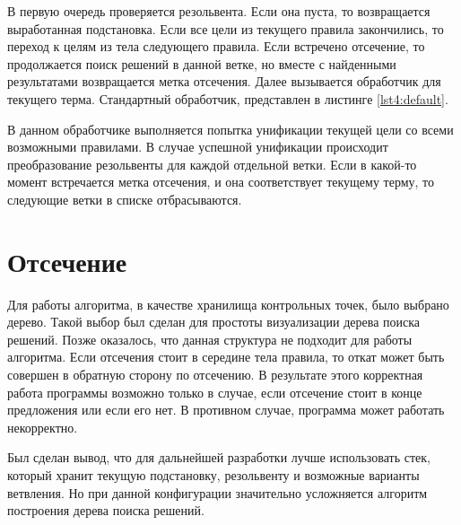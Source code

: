 В первую очередь проверяется резольвента. Если она пуста, то возвращается выработанная подстановка. Если все цели из текущего правила закончились, то переход к целям из тела следующего правила.
Если встречено отсечение, то продолжается поиск решений в данной ветке, но вместе с найденными результатами возвращается метка отсечения.
Далее вызывается обработчик для текущего терма. Стандартный обработчик, представлен в листинге \ref{lst4:default}.


В данном обработчике выполняется попытка унификации текущей цели со всеми возможными правилами. В случае успешной унификации происходит преобразование резольвенты для каждой отдельной ветки. Если в какой-то момент встречается метка отсечения, и она соответствует текущему терму, то следующие ветки в списке отбрасываются.

\section{Отсечение}
Для работы алгоритма, в качестве хранилища контрольных точек, было выбрано дерево. Такой выбор был сделан для простоты визуализации дерева поиска решений. Позже оказалось, что данная структура не подходит для работы алгоритма. Если отсечения стоит в середине тела правила, то откат может быть совершен в обратную сторону по отсечению. В результате этого корректная работа программы возможно только в случае, если отсечение стоит в конце предложения или если его нет. В противном случае, программа может работать некорректно. 

Был сделан вывод, что для дальнейшей разработки лучше использовать стек, который хранит текущую подстановку, резольвенту и возможные варианты ветвления. Но при данной конфигурации значительно усложняется алгоритм построения дерева поиска решений.



